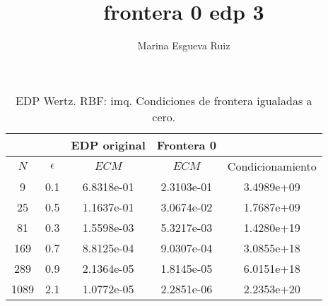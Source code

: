 \documentclass[11pt,a4paper]{article}
\author{Marina Esgueva Ruiz}
\title{frontera 0 edp 3}
\begin{document}
\begin{table}[ht]
\begin{center}
\caption{EDP Wertz. RBF: imq. Condiciones de frontera igualadas a cero.}
\begin{tabular}{|c|c|c|c|c|}
\hline
 \multicolumn{2}{|c|}{ }& EDP original&Frontera 0 &  \\
 \hline
 $N$ & $\epsilon$ & $ECM$  & $ECM$ & Condicionamiento \\
 \hline 
 9 & 0.1 & 6.8318e-01 & 2.3103e-01 & 3.4989e+09 \\
 25 & 0.5 & 1.1637e-01 & 3.0674e-02 & 1.7687e+09 \\
 81 & 0.3 & 1.5598e-03 & 5.3217e-03 & 1.4280e+19 \\
 169 & 0.7 & 8.8125e-04 & 9.0307e-04 & 3.0855e+18 \\
 289 & 0.9 & 2.1364e-05 &  1.8145e-05 & 6.0151e+18 \\
 1089 & 2.1& 1.0772e-05& 2.2851e-06 & 2.2353e+20 \\
 \hline 
 
\end{tabular}

\end{center}
\end{table}
\end{document}
